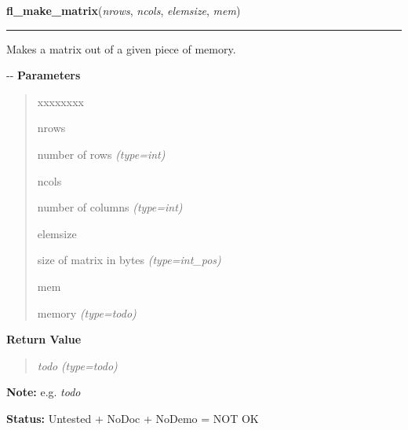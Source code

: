     \vspace{0.5ex}

\hspace{.8\funcindent}\begin{boxedminipage}{\funcwidth}

    \raggedright \textbf{fl\_make\_matrix}(\textit{nrows}, \textit{ncols}, \textit{elemsize}, \textit{mem})

    \vspace{-1.5ex}

    \rule{\textwidth}{0.5\fboxrule}
\setlength{\parskip}{2ex}

Makes a matrix out of a given piece of memory.

-{}-
\setlength{\parskip}{1ex}
      \textbf{Parameters}
      \vspace{-1ex}

      \begin{quote}
        \begin{Ventry}{xxxxxxxx}

          \item[nrows]


number of rows
            {\it (type=int)}

          \item[ncols]


number of columns
            {\it (type=int)}

          \item[elemsize]


size of matrix in bytes
            {\it (type=int\_pos)}

          \item[mem]


memory
            {\it (type=\emph{todo})}

        \end{Ventry}

      \end{quote}

      \textbf{Return Value}
    \vspace{-1ex}

      \begin{quote}

\emph{todo}
      {\it (type=\emph{todo})}

      \end{quote}

\textbf{Note:} 
e.g. \emph{todo}


\textbf{Status:} 
Untested + NoDoc + NoDemo = NOT OK


    \end{boxedminipage}

